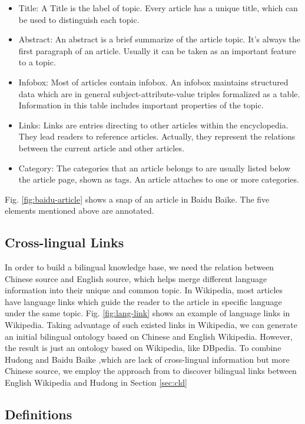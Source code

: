 \documentclass[runningheads,a4paper]{llncs}
\begin{document}
\begin{itemize}
  \item Title: A Title is the label of topic. Every article has a unique title, which can be used to distinguish each topic.
  \item Abstract: An abstract is a brief summarize of the article topic. It's always the first paragraph of an article. Usually it can be taken as an important feature to a topic. 
  \item Infobox: Most of articles contain infobox. An infobox maintains structured data which are in general subject-attribute-value triples formalized as a table. Information in this table includes important properties of the topic.
  \item Links: Links are entries directing to other articles within the encyclopedia. They lead readers to reference articles. Actually, they represent the relations between the current article and other articles.
  \item Category: The categories that an article belongs to are usually listed below the article page, shown as tags. An article attaches to one or more categories.
\end{itemize}
Fig. \ref{fig:baidu-article} shows a snap of an article in Baidu Baike. The five elements mentioned above are annotated.
\subsection{Cross-lingual Links}
In order to build a bilingual knowledge base, we need the relation between Chinese source and English source, which helps merge different language information into their unique and common topic. In Wikipedia, most articles have language links which guide the reader to the article in specific language under the same topic. Fig. \ref{fig:lang-link} shows an example of language links in Wikipedia. Taking advantage of such existed links in Wikipedia, we can generate an initial bilingual ontology based on Chinese and English Wikipedia. However, the result is just an ontology based on Wikipedia, like DBpedia. To combine Hudong and Baidu Baike ,which are lack of cross-lingual information but more Chinese source, we employ the approach from \cite{} to discover bilingual links between English Wikipedia and Hudong in Section \ref{sec:cld}  

\subsection{Definitions}
\end{document}
